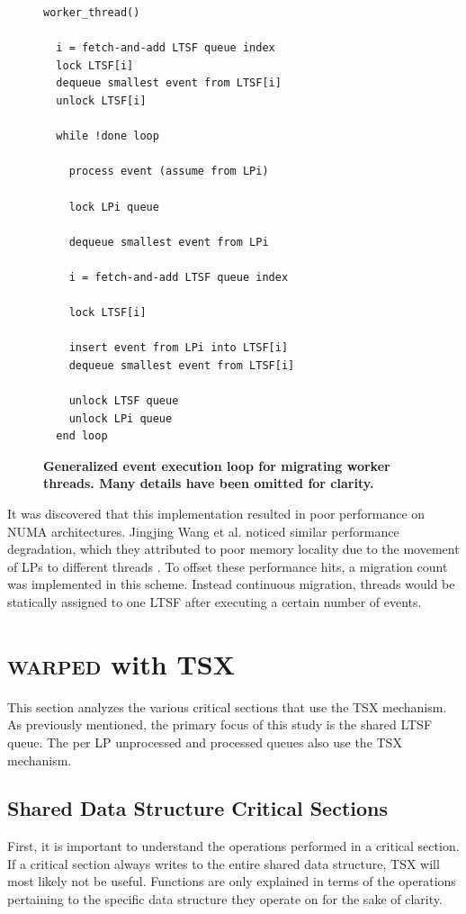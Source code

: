 \documentclass[11pt]{book}
\begin{document}
\linespread{1.0}
\begin{figure}
\begin{verbatim}
worker_thread()

  i = fetch-and-add LTSF queue index
  lock LTSF[i]
  dequeue smallest event from LTSF[i]
  unlock LTSF[i]

  while !done loop

    process event (assume from LPi)

    lock LPi queue
    
    dequeue smallest event from LPi

    i = fetch-and-add LTSF queue index

    lock LTSF[i]

    insert event from LPi into LTSF[i]
    dequeue smallest event from LTSF[i]

    unlock LTSF queue
    unlock LPi queue
  end loop
\end{verbatim}
\caption{\textbf{Generalized event execution loop for migrating worker threads.  Many
    details have been omitted for clarity.}}\label{migratinWorkerThreadAlgorithm}
\end{figure}

It was discovered that this implementation resulted in poor performance on NUMA
architectures.  Jingjing Wang et al. noticed similar performance degradation, which they
attributed to poor memory locality due to the movement of LPs to different threads
\cite{numa}.  To offset these performance hits, a migration count was implemented in this
scheme.  Instead continuous migration, threads would be statically assigned to one LTSF
after executing a certain number of events.


\chapter{\textsc{warped} with TSX}

This section analyzes the various critical sections that use the TSX mechanism.
As previously mentioned, the primary focus of this study is the shared LTSF
queue.  The per LP unprocessed and processed queues also use the TSX mechanism.

\section{Shared Data Structure Critical Sections}

First, it is important to understand the operations performed in a critical
section.  If a critical section always writes to the entire shared data
structure, TSX will most likely not be useful.  Functions are only explained in
terms of the operations pertaining to the specific data structure they operate
on for the sake of clarity.  
\end{document}
